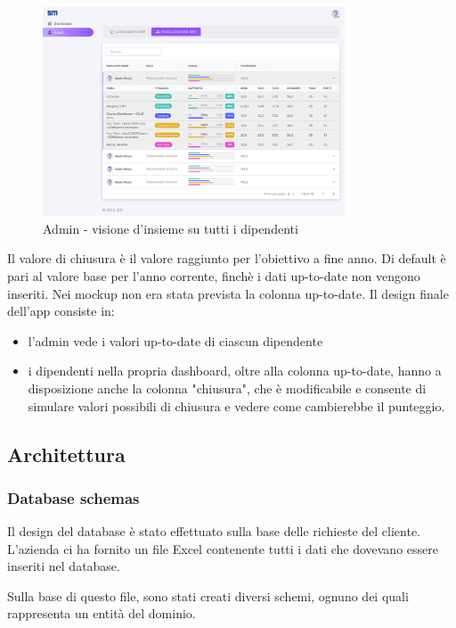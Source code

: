 \begin{figure}
    \centering
    \includegraphics[width=0.8\textwidth]{res/dati.png}
    \caption{Admin - visione d'insieme su tutti i dipendenti}
    \label{fig:dati}
\end{figure}


Il valore di chiusura è il valore raggiunto per l'obiettivo a fine anno. Di default è pari al valore base per l'anno corrente, finchè i dati up-to-date non vengono inseriti.
Nei mockup non era stata prevista la colonna up-to-date. Il design finale dell'app consiste in:
\begin{itemize}
    \item l'admin vede i valori up-to-date di ciascun dipendente
    \item i dipendenti nella propria dashboard, oltre alla colonna up-to-date, hanno a disposizione anche la colonna "chiusura", che è modificabile e consente di simulare valori possibili di chiusura e vedere come cambierebbe il punteggio.
\end{itemize}



\subsection*{Architettura}

\subsubsection{Database schemas}

Il design del database è stato effettuato sulla base delle richieste del cliente.
L'azienda ci ha fornito un file Excel contenente tutti i dati che dovevano essere inseriti nel database.

Sulla base di questo file, sono stati creati diversi schemi, ognuno dei quali rappresenta un entità del dominio.

